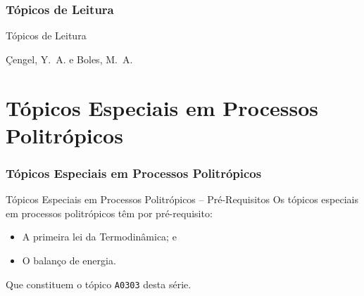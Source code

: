 \section{Tópicos de Leitura}

    \begin{frame}[allowframebreaks]{Tópicos de Leitura}
        \begin{thebibliography}{Çengel, Y.~A., 2013}
                Çengel, Y.~A. e Boles, M.~A.
        \end{thebibliography}
    \end{frame}


\part{Tópicos Especiais em Processos Politrópicos}

\section{Tópicos Especiais em Processos Politrópicos}

    \begin{frame}{Tópicos Especiais em Processos Politrópicos -- Pré-Requisitos}\vspace*{-2em}
        Os tópicos especiais em processos politrópicos têm por pré-requisito:
        \begin{itemize}
            \item A \alert{primeira lei da Termodinâmica}; e \\[\medskipamount]
            \item O \alert{balanço de energia}. \\[\bigskipamount]
        \end{itemize}
        Que constituem o tópico \texttt{A0303} desta série.
    \end{frame}

